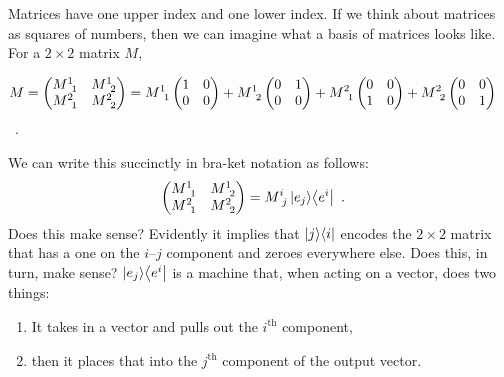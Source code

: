 \documentclass[12pt, oneside]{report}    %
\newenvironment{wide}{\begin{adjustwidth}{0cm}{-6.25cm}}{\end{adjustwidth}}
\begin{document}
Matrices have one upper index and one lower index. If we think about matrices as squares of numbers, then we can imagine what a basis of matrices looks like. For a $2\times 2$ matrix $M$,
\begin{wide}
 \begin{align}
        M=
     \begin{pmatrix}
         M\aij{1}{1} & M\aij{1}{2}\\
         M\aij{2}{1} & M\aij{2}{2}
     \end{pmatrix}
     &= 
     M\aij{1}{1} 
     \begin{pmatrix}
     1 & 0 \\
     0 & 0    
     \end{pmatrix}
     + M\aij{1}{2}
     \begin{pmatrix}
     0 & 1 \\
     0 & 0    
     \end{pmatrix}
     + M\aij{2}{1} 
     \begin{pmatrix}
     0 & 0 \\
     1 & 0    
     \end{pmatrix}
     + M\aij{2}{2}
     \begin{pmatrix}
     0 & 0 \\
     0 & 1    
     \end{pmatrix}
\end{align} \ .
\label{eq:M:2:2:basis:of:matrices:0}
\end{wide}
We can write this succinctly in bra-ket notation as follows:
\begin{align}
    \begin{pmatrix}
         M\aij{1}{1} & M\aij{1}{2}\\
         M\aij{2}{1} & M\aij{2}{2}
     \end{pmatrix}
     &= 
     M\aij{i}{j} \ket{e_j}\!\bra{e^i} \ .
     \label{eq:M:2:2:basis:of:matrices:1}
\end{align}
Does this make sense? Evidently it implies that $\left|j\right\rangle\!\left\langle i\right|$ encodes the $2\times 2$ matrix that has a one on the $i$--$j$ component and zeroes everywhere else.
% 
Does this, in turn, make sense? $\left|e_j\right\rangle\!\left\langle e^i\right|$ is a machine that, when acting on a vector, does two things:
\begin{enumerate}
    \item It takes in a vector and pulls out the $i^\text{th}$ component,
    \item then it places that into the $j^\text{th}$ component of the output vector.
\end{enumerate}
\end{document}
